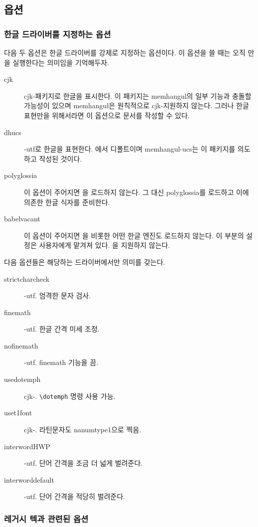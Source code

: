 \documentclass[
	12pt,
	a4paper,
	kosection,
	footnote,
	microtype,
	figtabcapt,
]{oblivoir}
\newcommand\obclass{ob\-liv\-oir\oblivoirallowbreak}
\begin{document}
\subsection{ 옵션}

\subsubsection{한글 드라이버를 지정하는 옵션}

다음 두 옵션은 한글 드라이버를 강제로 지정하는 옵션이다. 이 옵션을 쓸 때는 오직 만을 
실행한다는 의미임을 기억해두자.
\begin{description}
\item [cjk] cjk-\ko 패키지로 한글을 표시한다. 이 패키지는 memhangul의 일부 기능과 충돌할 가능성이
있으며 memhangul은 원칙적으로 cjk- 지원하지 않는다. 그러나 한글 표현만을 위해서라면 이 옵션으로
문서를 작성할 수 있다.
\item [dhucs] \koTeX-utf로 한글을 표현한다. 에서 디폴트이며 memhangul-ucs는
이 패키지를 의도하고 작성된 것이다.
\item [polyglossia] 이 옵션이 주어지면 \koTeX 을 로드하지 않는다. 그 대신 \textsf{polyglossia}를 로드하고 이에 의존한 한글 식자를 준비한다.
\item [babelvacant] 이 옵션이 주어지면 \koTeX 을 비롯한 어떤 한글 엔진도 로드하지 않는다. 이 부분의 설정은 사용자에게 맡겨져 있다. 을 지원하지 않는다.
\end{description}

다음 옵션들은 해당하는 드라이버에서만 의미를 갖는다.
\begin{description}
\item [strictcharcheck] \koTeX-utf. 엄격한 문자 검사.
\item [finemath] \koTeX-utf. 한글 간격 미세 조정.
\item [nofinemath] \koTeX-utf. finemath 기능을 끔.
\item [usedotemph] cjk-\ko. \verb|\dotemph| 명령 사용 가능.
\item [uset1font] cjk-\ko. 라틴문자도 nanumtype1으로 찍음.
\item [interwordHWP] \koTeX-utf. 단어 간격을 조금 더 넓게 벌려준다.
\item [interworddefault] \koTeX-utf. 단어 간격을 적당히 벌려준다.
\end{description}

\subsubsection{레거시 텍과 관련된 옵션}
\end{document}
